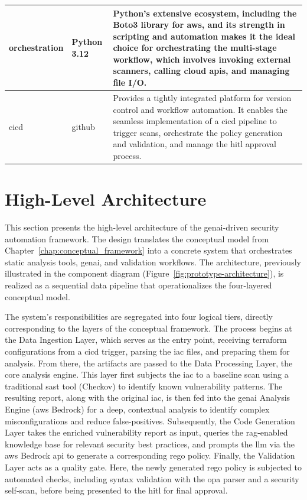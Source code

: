 \begin{center}
\begin{tabular}{|l|l|p{7cm}|}
\hline
\gls{orchestration} & Python 3.12 \cite{noauthor_whats_nodate} & Python's extensive ecosystem, including the Boto3 library for \gls{aws}, and its strength in scripting and automation makes it the ideal choice for orchestrating the multi-stage workflow, which involves invoking external scanners, calling cloud \gls{api}s, and managing file I/O. \\
\hline
\gls{cicd} & \gls{github} \cite{noauthor_github_2025} & Provides a tightly integrated platform for version control and workflow automation. It enables the seamless implementation of a \gls{cicd} pipeline to trigger scans, orchestrate the policy generation and validation, and manage the \gls{hitl} approval process. \\
\hline
\end{tabular}
\label{tab:tech_stack}
\end{center}

\section{High-Level Architecture}

This section presents the high-level architecture of the \gls{genai}-driven security automation framework. The design translates the conceptual model from Chapter~\ref{chap:conceptual_framework} into a concrete system that orchestrates static analysis tools, \gls{genai}, and validation workflows. The architecture, previously illustrated in the component diagram (Figure~\ref{fig:prototype-architecture}), is realized as a sequential data pipeline that operationalizes the four-layered conceptual model.

The system's responsibilities are segregated into four logical tiers, directly corresponding to the layers of the conceptual framework. The process begins at the Data Ingestion Layer, which serves as the entry point, receiving \gls{terraform} configurations from a \gls{cicd} trigger, parsing the \gls{iac} files, and preparing them for analysis. From there, the artifacts are passed to the Data Processing Layer, the core analysis engine. This layer first subjects the \gls{iac} to a baseline scan using a traditional \gls{sast} tool (Checkov) to identify known vulnerability patterns. The resulting report, along with the original \gls{iac}, is then fed into the \gls{genai} Analysis Engine (\gls{aws} Bedrock) for a deep, contextual analysis to identify complex misconfigurations and reduce \glspl{false-positive}. Subsequently, the Code Generation Layer takes the enriched vulnerability report as input, queries the \gls{rag}-enabled knowledge base for relevant security best practices, and prompts the \gls{llm} via the \gls{aws} Bedrock \gls{api} to generate a corresponding \gls{rego} policy. Finally, the Validation Layer acts as a quality gate. Here, the newly generated \gls{rego} policy is subjected to automated checks, including syntax validation with the \gls{opa} parser and a security self-scan, before being presented to the \gls{hitl} for final approval.

